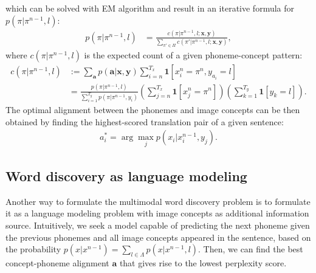 \documentclass[a4paper]{article}
\begin{document}
which can be solved with EM algorithm and result in an iterative formula for $p(\pi|\pi^{n-1}, l)$:
\begin{align}\label{eq:smt_em_trans_prob}
    p(\pi|\pi^{n-1}, l) &= \frac{c(\pi|\pi^{n-1}, l; \mathbf{x}, \mathbf{y})}{\sum_{\pi' \in \Pi}c(\pi'|\pi^{n-1}, l; \mathbf{x}, \mathbf{y})},
\end{align}
where $c(\pi|\pi^{n-1}, l)$ is the expected count of a given phoneme-concept pattern: 
\begin{align*}
    c(\pi|\pi^{n-1}, l) &:= \sum_{\mathbf a} p(\mathbf a|\mathbf x, \mathbf{y}) \sum_{i=n}^{T_x} \mathbf{1}[x_i^n=\pi^n, y_{a_i}=l] \\
    &= \frac{p(\pi|\pi^{n-1}, l)}{\sum_{i=1}^{T_y} p(\pi|\pi^{n-1}, y_i)} (\sum_{j=n}^{T_x} \mathbf{1}[x_j^n=\pi^n])(\sum_{k=1}^{T_y} \mathbf{1}[y_k=l]).
\end{align*}
The optimal alignment between the phonemes and image concepts can be then obtained by finding the highest-scored translation pair of a given sentence:
\begin{align}\label{eq:smt_alignment}
    a^*_i = \arg\max_j p(x_i|x^{n-1}_i, y_j).
\end{align}

\subsection{Word discovery as language modeling}
Another way to formulate the multimodal word discovery problem is to formulate it as a language modeling problem with image concepts as additional information source. Intuitively, we seek a model capable of predicting the next phoneme given the previous phonemes and all image concepts appeared in the sentence, based on the probability $p(x|x^{n-1}) = \sum_{l\in\Lambda}p(x|x^{n-1}, l)$. Then, we can find the best concept-phoneme alignment $\mathbf{a}$ that gives rise to the lowest perplexity score.
\end{document}
